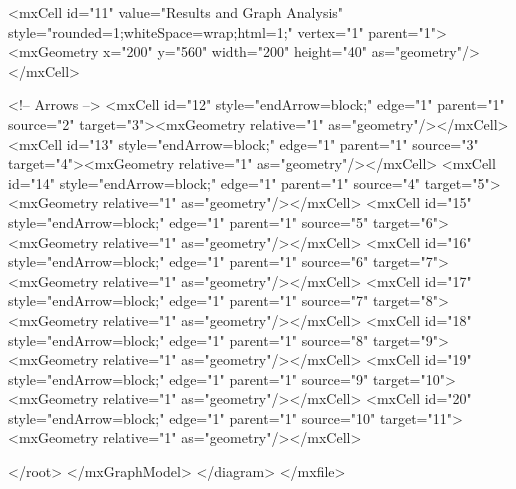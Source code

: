         <mxCell id="11" value="Results and Graph Analysis" style="rounded=1;whiteSpace=wrap;html=1;" vertex="1" parent="1">
          <mxGeometry x="200" y="560" width="200" height="40" as="geometry"/>
        </mxCell>

        <!-- Arrows -->
        <mxCell id="12" style="endArrow=block;" edge="1" parent="1" source="2" target="3"><mxGeometry relative="1" as="geometry"/></mxCell>
        <mxCell id="13" style="endArrow=block;" edge="1" parent="1" source="3" target="4"><mxGeometry relative="1" as="geometry"/></mxCell>
        <mxCell id="14" style="endArrow=block;" edge="1" parent="1" source="4" target="5"><mxGeometry relative="1" as="geometry"/></mxCell>
        <mxCell id="15" style="endArrow=block;" edge="1" parent="1" source="5" target="6"><mxGeometry relative="1" as="geometry"/></mxCell>
        <mxCell id="16" style="endArrow=block;" edge="1" parent="1" source="6" target="7"><mxGeometry relative="1" as="geometry"/></mxCell>
        <mxCell id="17" style="endArrow=block;" edge="1" parent="1" source="7" target="8"><mxGeometry relative="1" as="geometry"/></mxCell>
        <mxCell id="18" style="endArrow=block;" edge="1" parent="1" source="8" target="9"><mxGeometry relative="1" as="geometry"/></mxCell>
        <mxCell id="19" style="endArrow=block;" edge="1" parent="1" source="9" target="10"><mxGeometry relative="1" as="geometry"/></mxCell>
        <mxCell id="20" style="endArrow=block;" edge="1" parent="1" source="10" target="11"><mxGeometry relative="1" as="geometry"/></mxCell>

      </root>
    </mxGraphModel>
  </diagram>
</mxfile>
